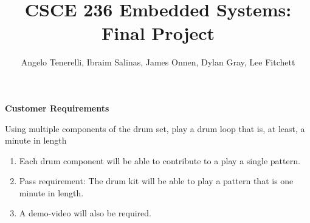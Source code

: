 \documentclass[]{report}
\title{CSCE 236 Embedded Systems: Final Project}
\author{Angelo Tenerelli, Ibraim Salinas, James Onnen, Dylan Gray, Lee Fitchett}
\begin{document}
\maketitle

\begin{center} \textbf{Customer	Requirements} \end{center}
	Using multiple components of the drum set, play a drum loop that is, at least, a minute in length
\begin{enumerate}
	\item  Each drum component will be able to contribute to a play a single pattern.
	\item Pass	requirement: The drum kit will be able to play a pattern that is one minute in length.
	\item A demo-video will also be required.
\end{enumerate}
	
\end{document}
